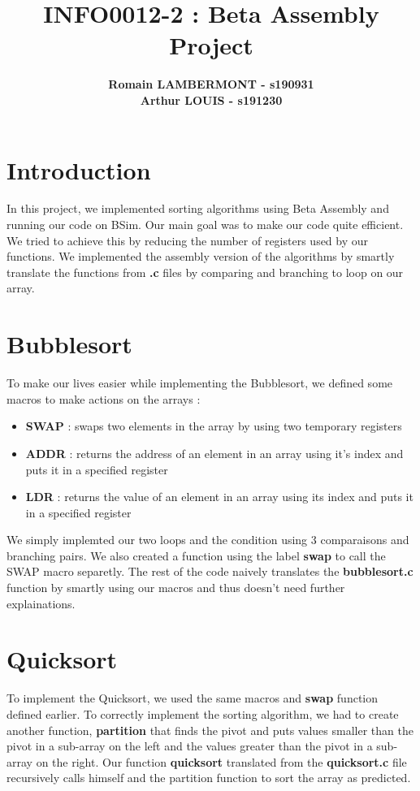 \documentclass{article}
\begin{document}

\title{\Large{ INFO0012-2 : Beta Assembly Project}}
\vspace{1cm}
\author{\small{\bf Romain LAMBERMONT - s190931} \\ \small{\bf Arthur LOUIS - s191230}}

\maketitle

\section{Introduction}
In this project, we implemented sorting algorithms using Beta Assembly and running our code on BSim.
Our main goal was to make our code quite efficient. We tried to achieve this by reducing the number of registers used by our functions.
We implemented the assembly version of the algorithms by smartly translate the functions from \textbf{.c} files by comparing and branching to loop on our array.

\section{Bubblesort}
To make our lives easier while implementing the Bubblesort, we defined some macros to make actions on the arrays :
\begin{itemize}
    \item \textbf{SWAP} : swaps two elements in the array by using two temporary registers
    \item \textbf{ADDR} : returns the address of an element in an array using it's index and puts it in a specified register
    \item \textbf{LDR} : returns the value of an element in an array using its index and puts it in a specified register
\end{itemize}

We simply implemted our two loops and the condition using 3 comparaisons and branching pairs. We also created a function using the label \textbf{swap} to call the
SWAP macro separetly. The rest of the code naively translates the \textbf{bubblesort.c} function by smartly using our macros and thus doesn't need further explainations.

\section{Quicksort}
To implement the Quicksort, we used the same macros and \textbf{swap} function defined earlier. To correctly implement the sorting algorithm, we had to create another function, 
\textbf{partition} that finds the pivot and puts values smaller than the pivot in a sub-array on the left and the values greater than the pivot in a sub-array on the right. Our function
\textbf{quicksort} translated from the \textbf{quicksort.c} file recursively calls himself and the partition function to sort the array as predicted.
\end{document}
